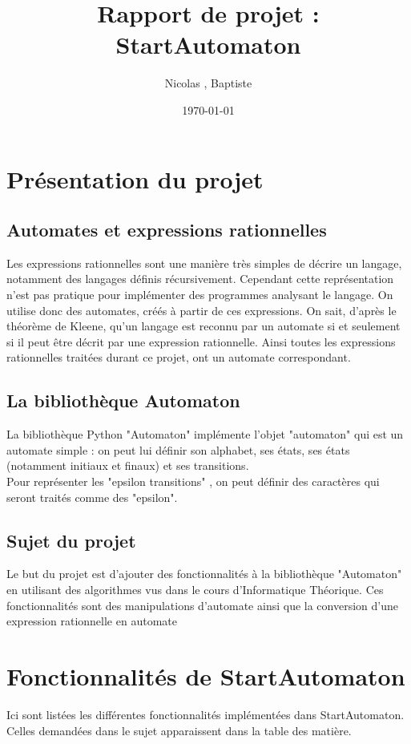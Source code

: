 \documentclass[a4paper, 12pt]{report}
\title{Rapport de projet : StartAutomaton}
\author{Nicolas \bsc{Endredi}, Baptiste \bsc{Oruezabal}}
\date{\today}
\begin{document}
\maketitle


\setcounter{tocdepth}{3}
\tableofcontents

\newpage
\section{Présentation du projet}
\subsection{Automates et expressions rationnelles}
Les expressions rationnelles sont une manière très simples de décrire un langage, notamment des langages définis récursivement. Cependant cette représentation n'est pas pratique pour implémenter des programmes analysant le langage. 
On utilise donc des automates, créés à partir de ces expressions. On sait, d'après le théorème de Kleene, qu'un langage est reconnu par un automate si et seulement si il peut être décrit par une expression rationnelle.
Ainsi toutes les expressions rationnelles traitées durant ce projet, ont un automate correspondant.
\subsection{La bibliothèque Automaton}
La bibliothèque Python "Automaton" implémente l'objet "automaton" qui est un automate simple : on peut lui définir son alphabet, ses états, ses états (notamment initiaux et finaux) et ses transitions.\\
Pour représenter les "epsilon transitions" , on peut définir des caractères qui seront traités comme des "epsilon".
\subsection{Sujet du projet}
Le but du projet est d'ajouter des fonctionnalités à la bibliothèque "Automaton" en utilisant des algorithmes vus dans le cours d'Informatique Théorique. Ces fonctionnalités sont des manipulations d'automate ainsi que la conversion d'une expression rationnelle en automate

\newpage
\section{Fonctionnalités de StartAutomaton}
Ici sont listées les différentes fonctionnalités implémentées dans StartAutomaton. Celles demandées dans le sujet apparaissent dans la table des matière.
\end{document}

